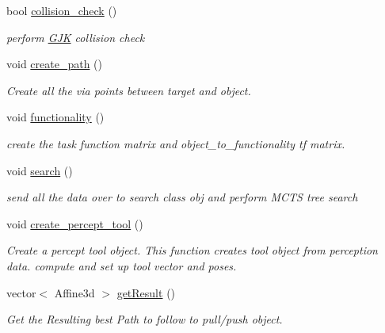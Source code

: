 \begin{DoxyCompactItemize}
bool \hyperlink{classTool__Expt_a35d5f7c664b44e813c3e1777b723d651}{collision\+\_\+check} ()
\begin{DoxyCompactList}\small\item\em perform \hyperlink{classGJK}{G\+JK} collision check \end{DoxyCompactList}\item 
\mbox{\label{classTool__Expt_a1909c4d9fad319e93cc7b92159e1b05f}} 
void \hyperlink{classTool__Expt_a1909c4d9fad319e93cc7b92159e1b05f}{create\+\_\+path} ()
\begin{DoxyCompactList}\small\item\em Create all the via points between target and object. \end{DoxyCompactList}\item 
\mbox{\label{classTool__Expt_a349b001e0a91bb223e6cd91622818b91}} 
void \hyperlink{classTool__Expt_a349b001e0a91bb223e6cd91622818b91}{functionality} ()
\begin{DoxyCompactList}\small\item\em create the task function matrix and object\+\_\+to\+\_\+functionality tf matrix. \end{DoxyCompactList}\item 
\mbox{\label{classTool__Expt_a317cc269d335366dec7d88fdf27e5f68}} 
void \hyperlink{classTool__Expt_a317cc269d335366dec7d88fdf27e5f68}{search} ()
\begin{DoxyCompactList}\small\item\em send all the data over to search class obj and perform M\+C\+TS tree search \end{DoxyCompactList}\item 
\mbox{\label{classTool__Expt_a53445178c772777722446614d5f3a966}} 
void \hyperlink{classTool__Expt_a53445178c772777722446614d5f3a966}{create\+\_\+percept\+\_\+tool} ()
\begin{DoxyCompactList}\small\item\em Create a percept tool object. This function creates tool object from perception data. compute and set up tool vector and poses. \end{DoxyCompactList}\item 
vector$<$ Affine3d $>$ \hyperlink{classTool__Expt_a0cace0822f22745b9aa5b7abaa2cec2b}{get\+Result} ()
\begin{DoxyCompactList}\small\item\em Get the Resulting best Path to follow to pull/push object. \end{DoxyCompactList}\item 

\end{DoxyCompactItemize}
